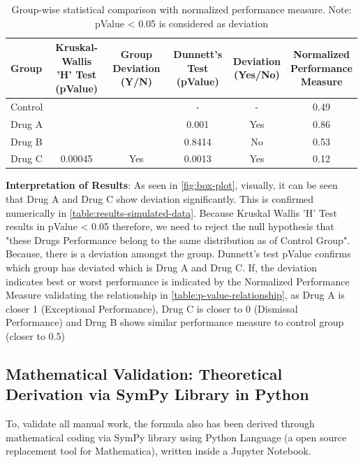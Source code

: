 \documentclass[a4paper,fleqn,review]{cas-sc}
\begin{document}
\begin{table}[!hbtp]
	\centering
	\renewcommand{\arraystretch}{1.3}
	\begin{tabular}{lccccc}
		\toprule
		\textbf{Group} &
		\makecell{\textbf{Kruskal-Wallis} \\ \textbf{'H' Test (pValue)}} &
		\makecell{\textbf{Group} \\ \textbf{Deviation (Y/N)}} &
		\makecell{\textbf{Dunnett's} \\ \textbf{Test (pValue)}} &
		\makecell{\textbf{Deviation} \\ \textbf{(Yes/No)}} &
		\makecell{\textbf{Normalized} \\ \textbf{Performance} \\ \textbf{Measure}} \\
		\midrule
		Control &         &     & -      & -    & 0.49 \\
		Drug A  &         &     & 0.001  & Yes  & 0.86 \\
		Drug B  &         &     & 0.8414 & No   & 0.53 \\
		Drug C  & \multirow{-3}{*}{0.00045} & \multirow{-3}{*}{Yes} & 0.0013 & Yes & 0.12 \\
		\bottomrule
	\end{tabular}
	\vspace{5pt}
	\caption{Group-wise statistical comparison with normalized performance measure. Note: pValue < 0.05 is considered as deviation}
	\label{table:results-simulated-data}
	
\end{table}

\textbf{Interpretation of Results}:
As seen in  \autoref{fig:box-plot}, visually, it can be seen that Drug A and Drug C show deviation significantly. This is confirmed numerically in \autoref{table:results-simulated-data}. Because Kruskal Wallis 'H' Test results in pValue < 0.05 therefore, we need to reject the null hypothesis that "these Drugs Performance belong to the same distribution as of Control Group". Because, there is a deviation amongst the group. Dunnett's test pValue confirms which group has deviated which is Drug A and Drug C. If, the deviation indicates best or worst performance is indicated by the Normalized Performance Measure validating the relationship in \autoref{table:p-value-relationship}, as Drug A is closer 1 (Exceptional Performance), Drug C is closer to 0 (Dismissal Performance) and Drug B shows similar performance measure to control group (closer to 0.5)

\subsection{Mathematical Validation: Theoretical Derivation via SymPy Library in Python}
To, validate all manual work, the formula also has been derived through mathematical coding via SymPy library using Python Language (a open source replacement tool for Mathematica), written inside a Jupyter Notebook.
\end{document}
